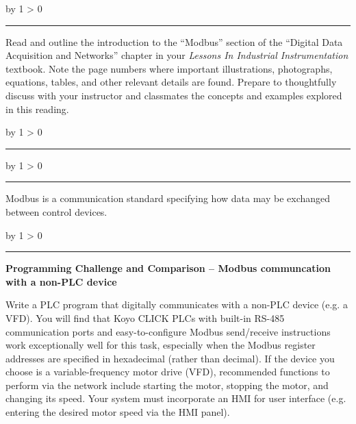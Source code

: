 \documentclass[12pt,a4paper]{article}
\def\oppgave{
            \advance\questnum by 1
            \ifnum \questnum > 0
                 \hrule
                 \vskip 3pt
                 \leftline{Oppgave \the\questnum}
                 \vskip 3pt \fi}
\def\svar{
           \advance\answnum by 1
           \ifnum \answnum > 0
                \hrule
                \vskip 3pt
                \leftline{Svar \the\answnum}
                \vskip 3pt \fi}
\def\notes{
           \advance\explnum by 1
           \ifnum \explnum > 0
                \hrule
                \vskip 3pt
                \leftline{Notes \the\explnum}
                \vskip 3pt \fi}
\begin{document}

\vfil \eject 



\oppgave{} 

Read and outline the introduction to the ``Modbus'' section of the ``Digital Data Acquisition and Networks'' chapter in your {\it Lessons In Industrial Instrumentation} textbook.  Note the page numbers where important illustrations, photographs, equations, tables, and other relevant details are found.  Prepare to thoughtfully discuss with your instructor and classmates the concepts and examples explored in this reading.

\vskip 10pt \filbreak 





\svar{} 


\vskip 10pt \filbreak 





\notes{} 

Modbus is a communication standard specifying how data may be exchanged between control devices.



\vfil \eject 



\oppgave{} 

\noindent
{\bf Programming Challenge and Comparison -- Modbus communcation with a non-PLC device} 

\vskip 10pt

Write a PLC program that digitally communicates with a non-PLC device (e.g. a VFD).  You will find that Koyo CLICK PLCs with built-in RS-485 communication ports and easy-to-configure Modbus send/receive instructions work exceptionally well for this task, especially when the Modbus register addresses are specified in hexadecimal (rather than decimal).  If the device you choose is a variable-frequency motor drive (VFD), recommended functions to perform via the network include starting the motor, stopping the motor, and changing its speed.  Your system must incorporate an HMI for user interface (e.g. entering the desired motor speed via the HMI panel).
\end{document}
